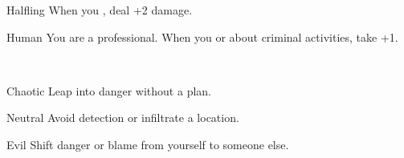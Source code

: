 \documentclass[8pt]{extarticle}
\begin{document}
\charbanner

\begin{minipage}[t]{3.2in}

\begin{optfeature}{Halfling}
  When you , deal +2 damage.
\end{optfeature}

\begin{optfeature}{Human}
  You are a professional. When you  or
   about criminal activities, take +1.
\end{optfeature}

\ 


\begin{optfeature}{Chaotic}
  Leap into danger without a plan.
\end{optfeature}

\begin{optfeature}{Neutral}
  Avoid detection or infiltrate a location.
\end{optfeature}

\begin{optfeature}{Evil}
  Shift danger or blame from yourself to someone else.
\end{optfeature}

\ 



\vfill\null
\end{minipage}
\end{document}
